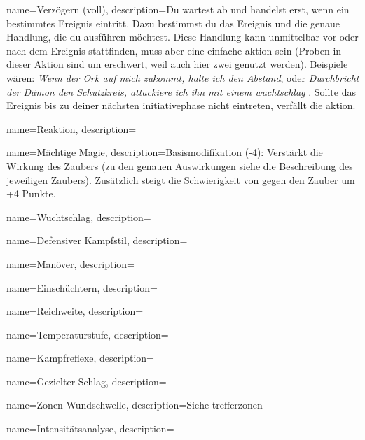 {
    name={Verzögern (voll)},
    description={Du wartest ab und handelst erst, wenn ein bestimmtes Ereignis eintritt. Dazu bestimmst du das Ereignis und die genaue Handlung, die du ausführen möchtest. Diese Handlung kann unmittelbar vor oder nach dem Ereignis stattfinden, muss aber eine einfache \gls{aktion} sein (Proben in dieser Aktion sind um  erschwert, weil auch hier zwei  genutzt werden). Beispiele wären: \textit{Wenn der Ork auf mich zukommt, halte ich den Abstand}, oder \textit{Durchbricht der Dämon den Schutzkreis, attackiere ich ihn mit einem \gls{wuchtschlag} }. Sollte das Ereignis bis zu deiner nächsten \gls{initiativephase} nicht eintreten, verfällt die \gls{aktion}.}}

{
    name={Reaktion},
    description={}}


{
    name={Mächtige Magie},
    description={Basismodifikation (-4): Verstärkt die Wirkung des Zaubers (zu den genauen Auswirkungen siehe die Beschreibung des jeweiligen Zaubers). Zusätzlich steigt die Schwierigkeit von  gegen den Zauber um +4 Punkte.}}
    
    

{
    name={Wuchtschlag},
    description={}}

{
    name={Defensiver Kampfstil},
    description={}}

{
    name={Manöver},
    description={}}

{
    name={Einschüchtern},
    description={}}

{
    name={Reichweite},
    description={}}

{
    name={Temperaturstufe},
    description={}}

{
    name={Kampfreflexe},
    description={}}

{
    name={Gezielter Schlag},
    description={}}

{
    name={Zonen-Wundschwelle},
    description={Siehe \gls{trefferzonen}}}

{
    name={Intensitätsanalyse},
    description={}}

